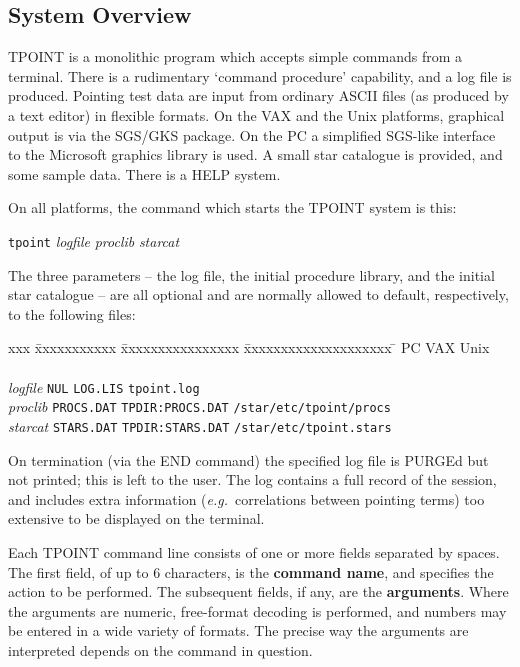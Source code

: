 \subsection{System Overview}
TPOINT is a monolithic program which accepts simple commands
from a terminal.  There is a rudimentary `command procedure'
capability, and a log file is produced.  Pointing test data
are input from ordinary ASCII files (as produced by a text
editor) in flexible formats.  On the VAX and the Unix platforms,
graphical output is via the SGS/GKS package.  On the PC a simplified
SGS-like interface to the Microsoft graphics library is used.
A small star catalogue is provided, and some sample data.  There
is a HELP system.

On all platforms, the command which starts the TPOINT system is this:
\begin{cmnds}
\> \> {\tt tpoint} {\it logfile} {\it proclib} {\it starcat}
\end{cmnds}
The three parameters -- the log file, the initial
procedure library, and the initial star catalogue --
are all optional and are normally allowed to default,
respectively, to the following files:
\begin{tabbing}
xxx \= xxxxxxxxxxx \= xxxxxxxxxxxxxxxx \= xxxxxxxxxxxxxxxxxxxx \= \kill
\> \> PC \> VAX \> Unix \\ \\
\> {\it logfile} \>
\verb|NUL| \>
\verb|LOG.LIS| \>
\verb|tpoint.log| \\
\> {\it proclib} \>
\verb|PROCS.DAT| \>
\verb|TPDIR:PROCS.DAT| \>
\verb|/star/etc/tpoint/procs| \\
\> {\it starcat} \>
\verb|STARS.DAT| \>
\verb|TPDIR:STARS.DAT| \>
\verb|/star/etc/tpoint.stars|
\end{tabbing}
On termination (via the END command) the specified log
file is PURGEd but not printed;  this is left to the user.  The
log contains a full record of the session, and includes extra
information ({\it e.g.}\ correlations between pointing terms) too
extensive to be displayed on the terminal.

Each TPOINT command line consists of one or more fields
separated by spaces.  The first field, of up to 6 characters,
is the {\bf command name}, and specifies the action to be performed.
The subsequent fields, if any, are the {\bf arguments}.
Where the arguments are numeric, free-format decoding is
performed, and numbers may be entered in a wide variety of
formats.
The precise way the arguments are interpreted depends on the
command in question.

